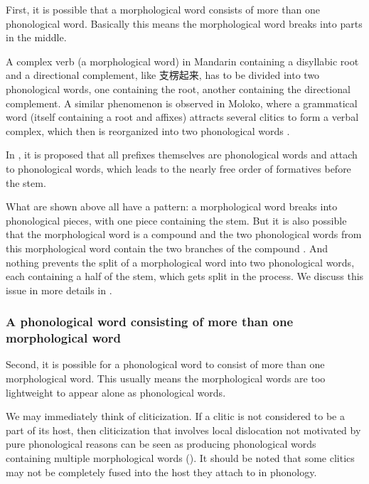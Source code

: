 \documentclass[a4paper, oneside, scheme=plain, 12pt]{article}
\newcommand*{\citepage}[1]{p.~{#1}}
\begin{document}
First, it is possible that a morphological word consists of more than one phonological word.
Basically this means the morphological word breaks into parts in the middle.

A complex verb (a morphological word) in Mandarin containing a disyllabic root and a directional complement,
like 支楞起来, has to be divided into two phonological words,
one containing the root, another containing the directional complement.
A similar phenomenon is observed in Moloko, where a grammatical word (itself containing a root and affixes) 
attracts several clitics to form a verbal complex,
which then is reorganized into two phonological words \citep[\citepage{202}]{Friesen2017}.

In \citet{bickel2007free}, it is proposed that all prefixes themselves are phonological words and attach to phonological words,
which leads to the nearly free order of formatives before the stem.

What are shown above all have a pattern:
a morphological word breaks into phonological pieces,
with one piece containing the stem.
But it is also possible that the morphological word is a compound
and the two phonological words from this morphological word
contain the two branches of the compound  \citep[\citepage{23}]{dixon2010basic2}.
And nothing prevents the split of a morphological word into two phonological words,
each containing a half of the stem, which gets split in the process.
We discuss this issue in more details in .

\subsubsection{A phonological word consisting of more than one morphological word}\label{sec:phonological-multiple-morphological-one-phonological}

Second, it is possible for a phonological word to consist of more than one morphological word.
This usually means the morphological words are too lightweight
to appear alone as phonological words.

We may immediately think of cliticization.
If a clitic is not considered to be a part of its host,
then cliticization that involves local dislocation not motivated by pure phonological reasons
can be seen as producing phonological words containing multiple morphological words
().
It should be noted that some clitics may not be completely fused into the host they attach to in phonology.
\end{document}
